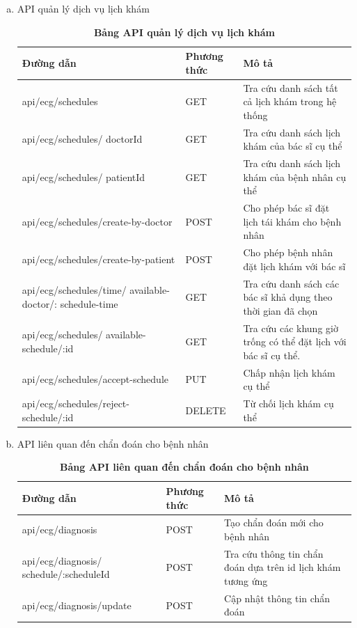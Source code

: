 \begin{enumerate}[a)]
  
  \item API quản lý dịch vụ lịch khám
  \begin{xltabular}{\textwidth}{
	| >{\raggedright\arraybackslash}m{4.5cm}
	| >{\centering\arraybackslash}m{2.8cm}
	| >{\raggedright\arraybackslash}X |
	}
	\caption{\bfseries \fontsize{12pt}{0pt}\selectfont Bảng API quản lý dịch vụ lịch khám}
	\label{table_api_schedule}
	\\
	\hline
	\bfseries Đường dẫn    &\bfseries Phương thức    &\bfseries Mô tả\\ \hline
	api/ecg/schedules   &   GET  & Tra cứu danh sách tất cả lịch khám trong hệ thống \\ \hline
	api/ecg/schedules/ doctorId  &    GET    & Tra cứu danh sách lịch khám của bác sĩ cụ thể \\ \hline
	api/ecg/schedules/ patientId  &    GET    & Tra cứu danh sách lịch khám của bệnh nhân cụ thể \\ \hline
	api/ecg/schedules/create-by-doctor  &    POST    & Cho phép bác sĩ đặt lịch tái khám cho bệnh nhân \\ \hline
	api/ecg/schedules/create-by-patient  &    POST    & Cho phép bệnh nhân đặt lịch khám với bác sĩ \\ \hline
	api/ecg/schedules/time/ available-doctor/: schedule-time  &    GET    & Tra cứu danh sách các bác sĩ khả dụng theo thời gian đã chọn \\ \hline
	api/ecg/schedules/ available-schedule/:id  &    GET    & Tra cứu các khung giờ trống có thể đặt lịch với bác sĩ cụ thể. \\ \hline
	api/ecg/schedules/accept-schedule  &    PUT    & Chấp nhận lịch khám cụ thể \\ \hline
	api/ecg/schedules/reject-schedule/:id  &    DELETE    & Từ chối lịch khám cụ thể \\ \hline
	\end{xltabular}
  
  \item API liên quan đến chẩn đoán cho bệnh nhân
  \begin{xltabular}{\textwidth}{
	| >{\raggedright\arraybackslash}m{4.5cm}
	| >{\centering\arraybackslash}m{2.8cm}
	| >{\raggedright\arraybackslash}X |
	}
	\caption{\bfseries \fontsize{12pt}{0pt}\selectfont Bảng API liên quan đến chẩn đoán cho bệnh nhân}
	\label{table_api_diagnosis}
	\\
	\hline
	\bfseries Đường dẫn    &\bfseries Phương thức    &\bfseries Mô tả\\ \hline
	api/ecg/diagnosis   &   POST  & Tạo chẩn đoán mới cho bệnh nhân \\ \hline
	api/ecg/diagnosis/ schedule/:scheduleId   &   POST  & Tra cứu thông tin chẩn đoán dựa trên id lịch khám tương ứng\\ \hline
	api/ecg/diagnosis/update   &   POST  & Cập nhật thông tin chẩn đoán \\ \hline
	\end{xltabular}
  

\end{enumerate}
